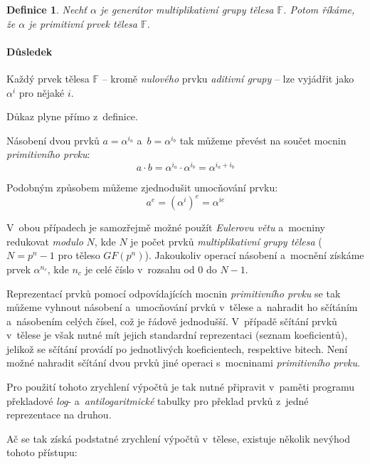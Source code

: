 \documentclass[thesis=M,czech,hidelinks]{FITthesis}[2012/06/26]
\newcommand{\0}{{\textcolor[gray]{0.75}{0}}}
\newtheorem{definice}{Definice}
\begin{document}
\begin{definice}
    Nechť $\alpha$ je \emph{generátor} \emph{multiplikativní grupy} tělesa
    $\mathbb{F}$. Potom říkáme, že $\alpha$ je \emph{primitivní prvek} tělesa
    $\mathbb{F}$.
\end{definice}

\paragraph{Důsledek} Každý prvek tělesa $\mathbb{F}$ -- kromě \emph{nulového}
prvku \emph{aditivní grupy} -- lze vyjádřit jako $\alpha^i$ pro nějaké $i$.

Důkaz plyne přímo z~definice.

Násobení dvou prvků $a = \alpha^{i_a}$ a~$b = \alpha^{i_b}$ tak můžeme převést
na součet mocnin \emph{primitivního prvku}:
$$ a \cdot b = \alpha^{i_a} \cdot \alpha^{i_b} = \alpha^{i_a + i_b} $$

Podobným způsobem můžeme zjednodušit umocňování prvku:
$$ a^e = \left(\alpha^i\right)^e = \alpha^{i e} $$

V~obou případech je samozřejmě možné použít \emph{Eulerovu větu} a~mocniny
redukovat \emph{modulo} $N$, kde $N$ je počet prvků \emph{multiplikativní grupy
tělesa} ($N=p^n-1$ pro těleso $GF(p^n)$). Jakoukoliv operací násobení a~mocnění
získáme prvek $\alpha^{n_c}$, kde $n_c$ je celé číslo v~rozsahu od $0$ do $N-1$.

Reprezentací prvků pomocí odpovídajících mocnin \emph{primitivního prvku} se tak
můžeme vyhnout násobení a~umocňování prvků v~tělese a~nahradit ho sčítáním
a~násobením celých čísel, což je řádově jednodušší. V~případě sčítání prvků
v~tělese je však nutné mít jejich standardní reprezentaci (seznam koeficientů),
jelikož se sčítání provádí po jednotlivých koeficientech, respektive bitech.
Není možné nahradit sčítání dvou prvků jiné operaci s~mocninami
\emph{primitivního prvku}.

Pro použití tohoto zrychlení výpočtů je tak nutné připravit v~paměti programu
překladové \emph{log}- a~\emph{antilogaritmické} tabulky pro překlad prvků
z~jedné reprezentace na druhou.

\clearpage

Ač se tak získá podstatné zrychlení výpočtů v~tělese, existuje několik nevýhod
tohoto přístupu:
\end{document}
